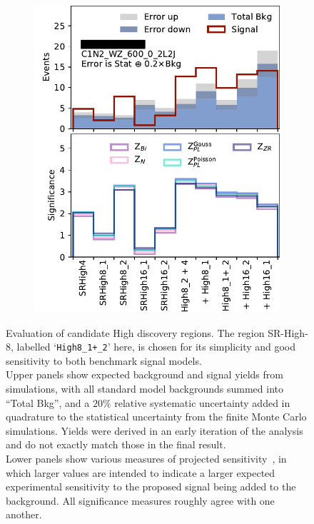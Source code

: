 \begin{figure}[tp]
\begin{subfigure}{0.495\textwidth}
\includegraphics[width=\textwidth]{figures/2ljets_disco_High_C1N2_WZ_600_0_2L2J.png}
\caption{}
\end{subfigure}
\caption[
Evaluation of candidate High discovery regions
]{%
Evaluation of candidate High discovery regions.
The region SR-High-8, labelled `\texttt{High8\_1+\_2}' here, is chosen for its
simplicity and good sensitivity to both benchmark signal models.\\[0.5em]
Upper panels show expected background and signal yields from simulations, with
all standard model backgrounds summed into ``Total Bkg'', and a $20\%$
relative systematic uncertainty added in quadrature to the statistical
uncertainty from the finite Monte Carlo simulations.
Yields were derived in an early iteration of the analysis and do not exactly
match those in the final result.\\[0.5em]
Lower panels show various measures of projected
sensitivity~\cite{cousins2008evaluation}, in which larger values are intended
to indicate a larger expected experimental sensitivity to the proposed signal
being added to the background.
All significance measures roughly agree with one another.
}
\label{fig:2ljets_disco_trials_high}
\end{figure}

